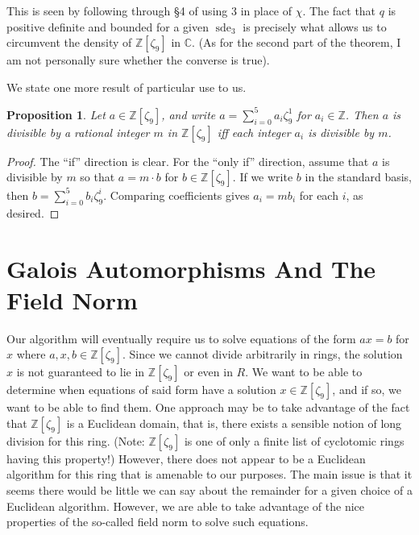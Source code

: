 \documentclass[12pt]{amsart}
\newtheorem{proposition}[theorem]{Proposition}
\theoremstyle{definition}
\newcommand{\Z}{\mathbb{Z}}
\newcommand{\C}{\mathbb{C}}
\newcommand{\Zn}{\mathbb{Z}[\zeta_9]}
\DeclareMathOperator{\sde}{sde}
\begin{document}
	This is seen by following through \S4 of \cite{Kal} using 3 in place of $\chi$. The fact that $q$ is positive definite and bounded for a given $\sde_3$ is precisely what allows us to circumvent the density of $\Zn$ in $\C$. (As for the second part of the theorem, I am not personally sure whether the converse is true).
	
	We state one more result of particular use to us.
	
	\begin{proposition}\label{P:2:5}
		Let $a \in \Zn$, and write $a = \sum_{i=0}^5 a_i \zeta_9^1$ for $a_i \in \Z$. Then $a$ is divisible by a rational integer $m$ in $\Zn$ iff each integer $a_i$ is divisible by $m$.
	\end{proposition}
	
	\begin{proof}
		The ``if'' direction is clear. For the ``only if'' direction, assume that $a$ is divisible by $m$ so that $a = m \cdot b$ for $b \in \Zn$. If we write $b$ in the standard basis, then $b = \sum_{i=0}^5 b_i \zeta_9^i$. Comparing coefficients gives $a_i = mb_i$ for each $i$, as desired.
	\end{proof}
	
	\section{Galois Automorphisms And The Field Norm}
	
	Our algorithm will eventually require us to solve equations of the form $ax = b$ for $x$ where $a,x,b \in \Zn$. Since we cannot divide arbitrarily in rings, the solution $x$ is not guaranteed to lie in $\Zn$ or even in $R$. We want to be able to determine when equations of said form have a solution $x \in \Zn$, and if so, we want to be able to find them. One approach may be to take advantage of the fact that $\Zn$ is a Euclidean domain, that is, there exists a sensible notion of long division for this ring. (Note: $\Zn$ is one of only a finite list of cyclotomic rings having this property!) However, there does not appear to be a Euclidean algorithm for this ring that is amenable to our purposes. The main issue is that it seems there would be little we can say about the remainder for a given choice of a Euclidean algorithm. However, we are able to take advantage of the nice properties of the so-called field norm to solve such equations.
	
\end{document}

